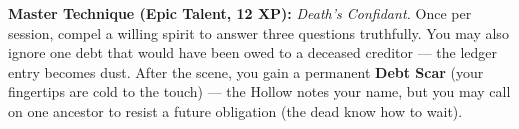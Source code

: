 \begin{tcolorbox}[colback=black!5,colframe=gray!70!black,title=\textbf{Bone Monk (Varnek Karn)},breakable]
  \vspace{2mm}
  \noindent\textbf{Master Technique (Epic Talent, 12 XP):}
  \textit{Death's Confidant.} Once per session, compel a willing spirit to answer three questions truthfully. You may also ignore one debt that would have been owed to a deceased creditor --- the ledger entry becomes dust. After the scene, you gain a permanent \textbf{Debt Scar} (your fingertips are cold to the touch) --- the Hollow notes your name, but you may call on one ancestor to resist a future obligation (the dead know how to wait).
\end{tcolorbox}